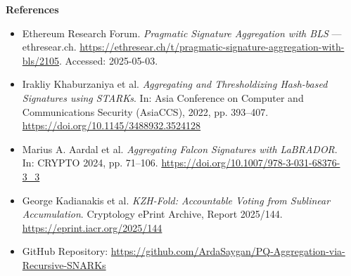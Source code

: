 \documentclass[final]{beamer}
\newlength{\sepwidth}
\newlength{\colwidth}
\newcommand{\separatorcolumn}{\begin{column}{\sepwidth}\end{column}}
\begin{document}
\begin{frame}[t]
\begin{columns}[t]
\begin{column}{\colwidth}
\begin{block}{\fontsize{42}{48}\selectfont\bfseries References}
\footnotesize
\begin{itemize}
    \item[\textbf{[1]}] Ethereum Research Forum. \textit{Pragmatic Signature Aggregation with BLS} — ethresear.ch. \url{https://ethresear.ch/t/pragmatic-signature-aggregation-with-bls/2105}. Accessed: 2025-05-03.
    
    \item[\textbf{[2]}] Irakliy Khaburzaniya et al. \textit{Aggregating and Thresholdizing Hash-based Signatures using STARKs}. In: Asia Conference on Computer and Communications Security (AsiaCCS), 2022, pp. 393–407. \url{https://doi.org/10.1145/3488932.3524128}
    
    \item[\textbf{[3]}] Marius A. Aardal et al. \textit{Aggregating Falcon Signatures with LaBRADOR}. In: CRYPTO 2024, pp. 71–106. \url{https://doi.org/10.1007/978-3-031-68376-3_3}
    
    \item[\textbf{[4]}] George Kadianakis et al. \textit{KZH-Fold: Accountable Voting from Sublinear Accumulation}. Cryptology ePrint Archive, Report 2025/144. \url{https://eprint.iacr.org/2025/144}
    
    \item[\textbf{[5]}] GitHub Repository: \url{https://github.com/ArdaSaygan/PQ-Aggregation-via-Recursive-SNARKs}
\end{itemize}
\end{block}





    
\end{column}

\separatorcolumn
\end{columns}
\end{frame}
\end{document}
